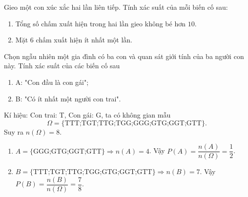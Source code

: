 \begin{bt}%
	Gieo một con xúc xắc hai lần liên tiếp. Tính xác suất của mỗi biến cố sau:
	\begin{enumerate}
		\item Tổng số chấm xuất hiện trong hai lần gieo không bé hơn $ 10 $.
		\item Mặt $ 6 $ chấm xuất hiện ít nhất một lần. 
	\end{enumerate}
\end{bt}

\begin{bt}%
	Chọn ngẫu nhiên một gia đình có ba con và quan sát giới tính của ba người con này. Tính xác suất của các biến cố sau
	\begin{enumerate}
		\item A: "Con đầu là con gái";
		\item B: "Có ít nhất một người con trai".
	\end{enumerate}
	\loigiai
	{
		Kí hiệu: Con trai: T, Con gái: G, ta có không gian mẫu
		$$\Omega =\{\text{TTT;TGT;TTG;TGG;GGG;GTG;GGT;GTT}\}.$$
		Suy ra $n(\Omega)=8$.
		\begin{enumerate}
			\item $A=\{\text{GGG;GTG;GGT;GTT}\}\Rightarrow n(A)=4$. Vậy $P(A)=\dfrac{n(A)}{n(\Omega)}=\dfrac{1}{2}$.
			\item $B=\{\text{TTT;TGT;TTG;TGG;GTG;GGT;GTT}\}\Rightarrow n(B)=7$. Vậy $P(B)=\dfrac{n(B)}{n(\Omega)}=\dfrac{7}{8}$. 
		\end{enumerate}
	}
\end{bt}

